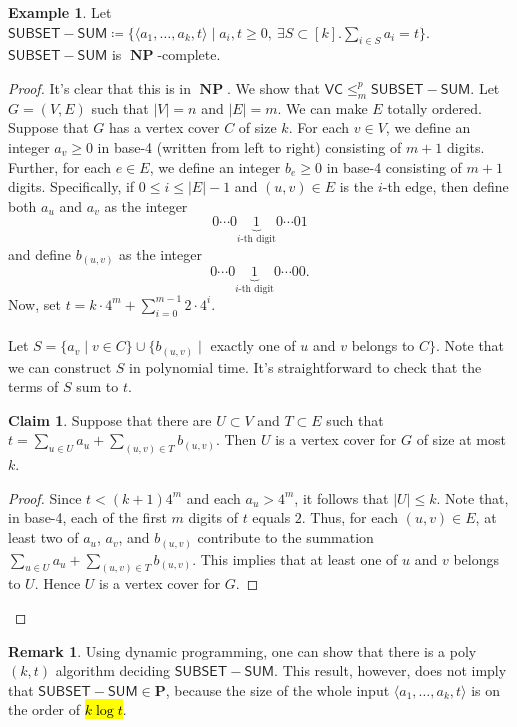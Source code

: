 \documentclass[10pt,letterpaper,cm]{nupset}
\theoremstyle{definition}
\newtheorem{exmp}{Example}
\newtheorem{claim}{Claim}
\newtheorem{remark}{Remark}
\newcommand{\1}{\mathbf{1}}
\newcommand{\0}{\vec 0}
\DeclareMathOperator{\NP}{\mathbf{NP}}
\begin{document}
\begin{exmp}
Let $\mathsf{SUBSET{-}SUM}\coloneqq \{\langle a_1, \ldots, a_k, t\rangle \mid a_i,t\geq 0,\ \exists S \subset [k].\sum_{i\in S} a_i = t\}$. $\mathsf{SUBSET{-}SUM}$ is $\NP$-complete.
\end{exmp}
\begin{proof}
It's clear that this is in $\NP$. We show that $\mathsf{VC} \leq_m^p \mathsf{SUBSET{-}SUM}$. Let $G=(V,E)$ such that $|V| = n$ and $|E|= m$. We can make $E$ totally ordered. Suppose that $G$ has a vertex cover $C$ of size $k$. For each $v\in V$, we define an integer $a_v\geq 0$ in base-4 (written from left to right) consisting of $m+1$ digits. Further, for each $e\in E$, we define an integer $b_e\geq 0$ in base-4 consisting of $m+1$ digits. Specifically, if $0\leq i \leq |E|-1$ and  $(u,v) \in E$ is the $i$-th edge, then define both $a_u$ and $a_v$  as the integer $$0 \cdots 0 \underbrace{1}_{i\text{-th digit}} 0 \cdots 01   $$ and define $b_{(u,v)}$ as the integer $$0 \cdots 0 \underbrace{1}_{i\text{-th digit}} 0 \cdots 00     .$$ Now, set $t= k \cdot 4^m + \sum_{i=0}^{m-1}2 \cdot 4^i$.
\\ \\ Let $S = \{a_v \mid v\in C\} \cup \{b_{(u,v)} \mid $ exactly one of $u$ and $v$ belongs to $C\}$. Note that we can construct $S$ in polynomial time. It's straightforward to check that the terms of $S$ sum to $t$. 
\begin{claim}
Suppose that there are $U\subset V$ and $T\subset E$ such that $t= \sum_{u\in U}a_u +\sum_{(u,v) \in T} b_{(u,v)}$. Then $U$ is a vertex cover for $G$ of size at most $k$.
\end{claim}
\begin{proof}
Since $t<(k+1)4^m$ and each $a_u> 4^m$, it follows that $|U|\leq k$. Note that, in base-4, each of the first $m$ digits of $t$ equals $2$. Thus, for each $(u,v) \in E$, at least two of $a_u$, $a_v$, and $b_{(u,v)}$ contribute to the summation $\sum_{u\in U}a_u +\sum_{(u,v) \in T} b_{(u,v)}$. This implies that at least one of $u$ and $v$ belongs to $U$. Hence $U$ is a vertex cover for $G$.
\end{proof}
\end{proof}

\begin{remark}
Using dynamic programming, one can show that there is a poly$(k, t)$ algorithm deciding $\mathsf{SUBSET{-}SUM}$. This result, however, does not imply that $\mathsf{SUBSET{-}SUM} \in \mathbf{P}$, because the size of the whole input $\langle a_1, \ldots, a_k, t\rangle$ is on the order of \hl{$k\log{t}$}.
\end{remark}
\end{document}
